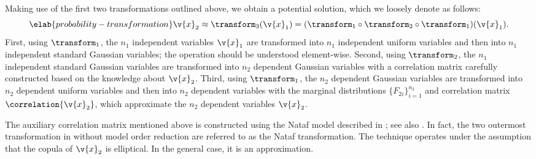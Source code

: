 Making use of the first two transformations outlined above, we obtain a
potential solution, which we loosely denote as follows:
\begin{equation} \elab{probability-transformation}
  \v{x}_2 \approx \transform_3(\v{x}_1) = (\transform_1 \circ \transform_2 \circ \transform_1)(\v{x}_1).
\end{equation}
First, using $\transform_1$, the $n_1$ independent variables $\v{x}_1$ are
transformed into $n_1$ independent uniform variables and then into $n_1$
independent standard Gaussian variables; the operation should be understood
element-wise. Second, using $\transform_2$, the $n_1$ independent standard
Gaussian variables are transformed into $n_2$ dependent Gaussian variables with
a correlation matrix carefully constructed based on the knowledge about
$\v{x}_2$. Third, using $\transform_1$, the $n_2$ dependent Gaussian variables
are transformed into $n_2$ dependent uniform variables and then into $n_2$
dependent variables with the marginal distributions $\{ F_{2i} \}_{i = 1}^{n_2}$
and correlation matrix $\correlation{\v{x}_2}$, which approximate the $n_2$
dependent variables $\v{x}_2$.

The auxiliary correlation matrix mentioned above is constructed using the Nataf
model described in \cite{liu1986}; see also \cite{li2008}. In fact, the two
outermost transformation in  without model
order reduction are referred to as the Nataf transformation. The technique
operates under the assumption that the copula of $\v{x}_2$ is elliptical. In the
general case, it is an approximation.
